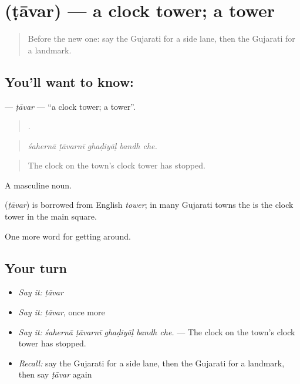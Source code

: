 \section[\texorpdfstring{\gu{ટાવર} (ṭāvar)}{ટાવર (ṭāvar)}]{ (ṭāvar) — a clock tower; a tower}

\label{lesson:GU-C415-tavar}



\begin{quote}
Before the new one: say the Gujarati for a side lane, then the Gujarati for a landmark.
\end{quote}

\subsection*{You'll want to know: }
\textbf{} — \emph{ṭāvar} — \textquotedblleft{}a clock tower; a tower\textquotedblright{}.

\begin{quote}
    .
\end{quote}

\begin{quote}
\emph{śahernā ṭāvarnī ghaḍiyāḷ bandh che.}
\end{quote}

\begin{quote}
The clock on the town's clock tower has stopped.
\end{quote}

A masculine noun.

\begin{cousinweb}
\textbf{} (\emph{ṭāvar}) is borrowed from English \emph{tower}; in many Gujarati towns the  is the clock tower in the main square.
\end{cousinweb}

\begin{grammarlens}[title={What you've built}]
One more word for getting around.
\end{grammarlens}

\subsection*{Your turn}
\begin{itemize}
\raggedright
  \item \emph{Say it:} \emph{ṭāvar}
  \item \emph{Say it:} \emph{ṭāvar}, once more
  \item \emph{Say it:} \emph{śahernā ṭāvarnī ghaḍiyāḷ bandh che.} — The clock on the town's clock tower has stopped.
  \item \emph{Recall:} say the Gujarati for a side lane, then the Gujarati for a landmark, then say \emph{ṭāvar} again
\end{itemize}

